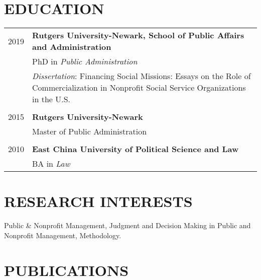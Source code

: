 \documentclass[letterpaper]{article}
\renewenvironment{itemize}{
  \begin{list}{}{
    \setlength{\leftmargin}{1.5em}
  }
}{
  \end{list}
}
\begin{document}
\bigskip

\section*{EDUCATION}

\begin{tabular}{ p{2.5cm} p{13cm} }
   2019 & \textbf{Rutgers University-Newark, School of Public Affairs and Administration} \\
   & PhD in \it{Public Administration} \\
   &{\it Dissertation}: Financing Social Missions: Essays on the Role of Commercialization in Nonprofit Social Service Organizations in the U.S.\\
   &\\
   2015 & \textbf{Rutgers University-Newark} \\
   &Master of Public Administration\\
   & \\
   2010 & \textbf{East China University of Political Science and Law} \\
   &BA in \it{Law}

\end{tabular}


\bigskip

\section*{RESEARCH INTERESTS}
\begin{itemize}
\item Public \& Nonprofit Management, Judgment and Decision Making in Public and Nonprofit Management, Methodology.
\end{itemize}

\bigskip



\section*{PUBLICATIONS}
\end{document}
